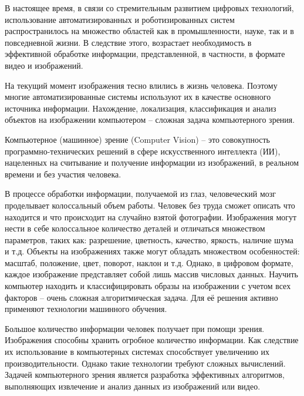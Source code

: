 В настоящее время, в связи со стремительным развитием цифровых технологий, использование автоматизированных и роботизированных систем распространилось на множество областей как в промышленности, науке, так и в повседневной жизни. В следствие этого, возрастает необходимость в эффективной обработке информации, представленной, в частности, в формате видео и изображений. 

На текущий момент изображения тесно влились в жизнь человека. Поэтому многие автоматизированные системы используют их в качестве основного источника информации. Нахождение, локализация, классификация и анализ объектов на изображении компьютером – сложная задача компьютерного зрения. 

Компьютерное (машинное) зрение (Computer Vision) – это совокупность программно-технических решений в сфере искусственного интеллекта (ИИ), нацеленных на считывание и получение информации из изображений, в реальном времени и без участия человека. 

В процессе обработки информации, получаемой из глаз, человеческий мозг проделывает колоссальный объем работы. Человек без труда сможет описать что находится и что происходит на случайно взятой фотографии. Изображения могут нести в себе колоссальное количество деталей и отличаться множеством параметров, таких как: разрешение, цветность, качество, яркость, наличие шума и т.д. Объекты на изображениях также могут обладать множеством особенностей: масштаб, положение, цвет, поворот, наклон и т.д. Однако, в цифровом формате, каждое изображение представляет собой лишь массив числовых данных.  Научить компьютер находить и классифицировать образы на изображении с учетом всех факторов – очень сложная алгоритмическая задача. Для её решения активно применяют технологии машинного обучения.

Большое количество информации человек получает при помощи зрения. 
Изображения способны хранить огробное количество информации. Как следствие их использование в компьютерных системах способствует увеличению их производительности. Однако такие технологии требуют сложных вычислений. Задачей компьютерного зрения является разработка эффективных алгоритмов, выполняющих извлечение и анализ данных из изображений или видео. 
 
